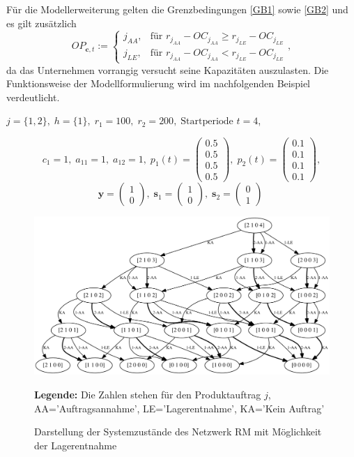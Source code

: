 Für die Modellerweiterung gelten die Grenzbedingungen \eqref{GB1} sowie \eqref{GB2} und es gilt zusätzlich
\begin{equation}\label{GB3}
     OP_{\textbf{c}, t}:=\left\{\begin{array}{ll} j_{AA}, & \text{für } r_{j_{AA}} - OC_{j_{AA}} \ge r_{j_{LE}} - OC_{j_{LE}}\\
         j_{LE}, & \text{für } r_{j_{AA}} - OC_{j_{AA}} < r_{j_{LE}} - OC_{j_{LE}}\end{array}\right. ,
\end{equation}
da das Unternehmen vorrangig versucht seine Kapazitäten auszulasten. Die Funktionsweise der Modellformulierung wird im nachfolgenden Beispiel verdeutlicht.
\begin{center}
$j = \{1, 2\}, \; h = \{1\}, \; r_{1} = 100, \; r_{2} = 200, \; \text{Startperiode } t=4$,
\end{center}
\[
    c_{1}=1, \;
    a_{11}=1, \;
     a_{12}=1, \;
     p_{1}(t)=\begin{pmatrix} 0.5\\ 0.5\\ 0.5\\ 0.5  \end{pmatrix}, \;
     p_{2}(t)=\begin{pmatrix} 0.1\\ 0.1\\ 0.1\\ 0.1  \end{pmatrix},
  \]
  \[
    \textbf{y}=\begin{pmatrix} 1 \\ 0 \end{pmatrix}, \;
    \textbf{s}_1=\begin{pmatrix} 1 \\ 0 \end{pmatrix}, \;
     \textbf{s}_2=\begin{pmatrix} 0 \\ 1 \end{pmatrix} \;
  \]

\begin{figure}[h!]
  \begin{center}
    \includegraphics[width=130mm]{Bilder/Beispiel3.pdf}
    \caption{Darstellung der Systemzustände des Netzwerk RM mit Möglichkeit der Lagerentnahme}  \label{B3}
    {\footnotesize \textbf{Legende:} Die Zahlen stehen für den Produktauftrag $j$, AA='Auftragsannahme', LE='Lagerentnahme', KA='Kein Auftrag'} 
  \end{center}
\end{figure}

